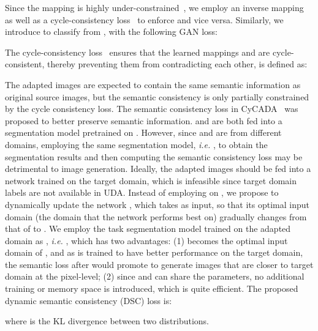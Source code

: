 \documentclass{article}
\begin{document}
Since the mapping  is highly under-constrained~\cite{goodfellow2014generative}, we employ an inverse mapping  as well as a cycle-consistency loss~\cite{zhu2017unpaired} to enforce  and vice versa. Similarly, we introduce  to classify  from , with the following GAN loss:

The cycle-consistency loss~\cite{zhu2017unpaired} ensures that the learned mappings  and  are cycle-consistent, thereby preventing them from contradicting each other, is defined as:


The adapted images are expected to contain the same semantic information as original source images, but the semantic consistency is only partially constrained by the cycle consistency loss. The semantic consistency loss in CyCADA~\cite{hoffman2018cycada} was proposed to better preserve semantic information.  and  are both fed into a segmentation model  pretrained on . However, since  and  are from different domains, employing the same segmentation model, \textit{i.e.} , to obtain the segmentation results and then computing the semantic consistency loss may be detrimental to image generation. Ideally, the adapted images  should be fed into a network   trained on the target domain, which is infeasible since target domain labels are not available in UDA. Instead of employing  on , we propose to dynamically update the network , which takes  as input, so that its optimal input domain (the domain that the network performs best on) gradually changes from that of  to . We employ the task segmentation model  trained on the adapted domain as , \textit{i.e.} , which has two advantages: (1)  becomes the optimal input domain of , and as  is trained to have better performance on the target domain, the semantic loss after  would promote  to generate images that are closer to target domain at the pixel-level; (2) since  and  can share the parameters, no additional training or memory space is introduced, which is quite efficient.
The proposed dynamic semantic consistency (DSC) loss is:

where  is the KL divergence between two distributions.
\end{document}
